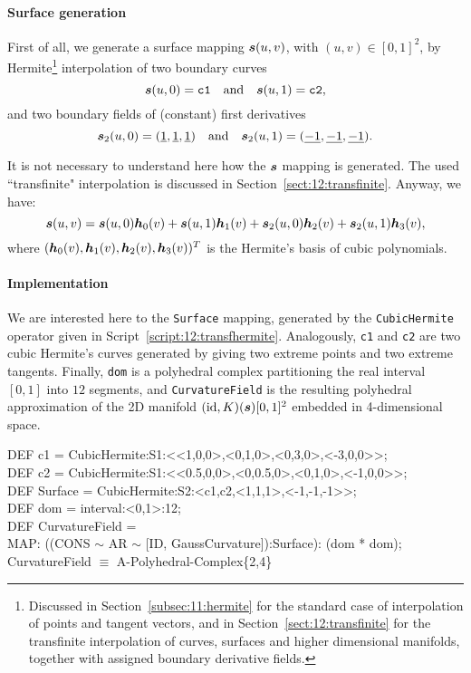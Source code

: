 \documentclass{31x47jw}
\begin{document}
\paragraph{Surface generation}

First of all, we generate a surface mapping ${\mbox{\boldmath $s$}}(u,v)$, with
$(u,v)\in [0,1]^{2}$, by Hermite\footnote{Discussed in Section~\ref{subsec:11:hermite}
for the standard case of interpolation of points and tangent vectors,
and in Section~\ref{sect:12:transfinite} for the transfinite interpolation of curves,
surfaces and higher dimensional manifolds, together with assigned
boundary derivative fields.} interpolation of two boundary curves
\[
{\mbox{\boldmath $s$}}(u,0) = \texttt{c1}  \quad\mbox{and}\quad {\mbox{\boldmath $s$}}(u,1) = 
\texttt{c2},
\]
and two boundary fields of
(constant) first derivatives 
\[
{\mbox{\boldmath $s$}}_{2}(u,0) = (\underline{1},\underline{1},\underline{1})
\quad\mbox{and}\quad {\mbox{\boldmath $s$}}_{2}(u,1) =
(\underline{-1},\underline{-1},\underline{-1}).
\]

It is not necessary to understand here how the ${\mbox{\boldmath $s$}}$ mapping is
generated.  The used ``transfinite" interpolation is discussed in
Section~\ref{sect:12:transfinite}.  Anyway, we have:
\[
{\mbox{\boldmath $s$}}(u,v) = {\mbox{\boldmath $s$}}(u,0) {\mbox{\boldmath $h$}}_{0}(v) + {\mbox{\boldmath $s$}}(u,1) {\mbox{\boldmath $h$}}_{1}(v) +
{\mbox{\boldmath $s$}}_{2}(u,0) {\mbox{\boldmath $h$}}_{2}(v) + {\mbox{\boldmath $s$}}_{2}(u,1) {\mbox{\boldmath $h$}}_{3}(v),
\]
where $({\mbox{\boldmath $h$}}_{0}(v), {\mbox{\boldmath $h$}}_{1}(v), {\mbox{\boldmath $h$}}_{2}(v), {\mbox{\boldmath $h$}}_{3}(v))^{T}$ is
the Hermite's basis of cubic polynomials.  

\paragraph{Implementation}

We are interested here to the \texttt{Surface} mapping, generated by
the \texttt{CubicHermite} operator given in Script~\ref{script:12:transfhermite}.  Analogously,
\texttt{c1} and \texttt{c2} are two cubic Hermite's curves generated
by giving two extreme points and two extreme tangents.  Finally,
\texttt{dom} is a polyhedral complex partitioning the real interval
$[0,1]$ into $12$ segments, and \texttt{CurvatureField} is the
resulting polyhedral approximation of the 2D manifold
$(\mbox{id},K)({\mbox{\boldmath $s$}})[0,1]^{2}$ embedded in 4-dimensional space.

\begin{script}
\begin{smallplasm}
DEF c1 = CubicHermite:S1:<<1,0,0>,<0,1,0>,<0,3,0>,<-3,0,0>>;\\
DEF c2 = CubicHermite:S1:<<0.5,0,0>,<0,0.5,0>,<0,1,0>,<-1,0,0>>;\\
DEF Surface = CubicHermite:S2:<c1,c2,<1,1,1>,<-1,-1,-1>>;\\[0.3cm]

DEF dom = interval:<0,1>:12;\\
DEF CurvatureField = \+\\
  MAP: ((CONS $\sim$ AR $\sim$ [ID, GaussCurvature]):Surface): (dom * 
dom);\-\\[0.3cm]

CurvatureField $\equiv$ A-Polyhedral-Complex\{2,4\}
\end{smallplasm}
\label{script:5:geomdata}
\end{script}
\end{document}
